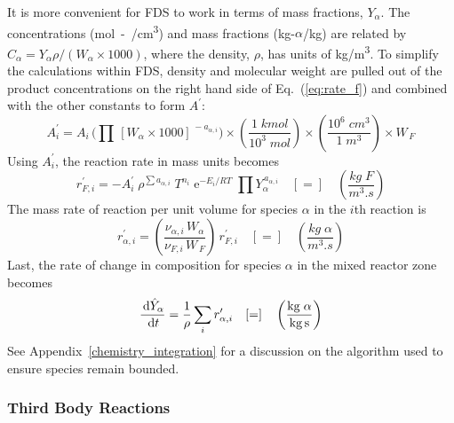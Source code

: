 It is more convenient for FDS to work in terms of mass fractions, $Y_{\alpha}$.  The concentrations (\unit{mol-\alpha/cm^3}) and mass fractions (kg-$\alpha$/kg) are related by $C_{\alpha}=Y_{\alpha} \rho/(W_{\alpha} \times 1000)$, where the density, $\rho$, has units of \unit{kg/m^3}.
To simplify the calculations within FDS, density and molecular weight are pulled out of the product concentrations on the right hand side of Eq.~(\ref{eq:rate_f}) and combined with the other constants to form $A^{\prime}$:
\begin{equation}\label{eq:aprime}
A^{\prime}_{i} = A_{i} \, \bigg( \prod \, [W_{\alpha} \times 1000]^{\,-a_{\alpha,i}} \bigg) \times \left(\frac{1 \; \unit{kmol}}{10^3 \; \unit{mol}}\right) \times \left(\frac{10^6 \; \unit{cm^3}}{1 \; \unit{m^3}}\right) \times W_{\,\unit{F}}
\end{equation}
Using $A_i^{\prime}$, the reaction rate in mass units becomes
\begin{equation}\label{eq:finite_rate_fin}
r^{\prime}_{\unit{F},i} = -A_i^{\prime}\;\rho^{\sum a_{\alpha,i}}\;T^{n_i}\;\mathrm{e}^{-E_i/RT}\;\prod Y_{\alpha}^{\,a_{\alpha,i}} \quad [=] \quad \left(\frac{\unit{kg \; F}}{\unit{m^3.s}}\right)
\end{equation}
The mass rate of reaction per unit volume for species $\alpha$ in the $i$th reaction is
\begin{equation}\label{eq:rate_a_y}
r^{\prime}_{\alpha,i}= \left(\frac{\nu_{\alpha,i}\,W_{\alpha}}{\nu_{\unit{F},i}\,W_{\,\unit{F}}}\right)\,r^{\prime}_{\unit{F},i} \quad [=] \quad \left(\frac{\unit{kg \; \alpha}}{\unit{m^3.s}}\right)
\end{equation}
Last, the rate of change in composition for species $\alpha$ in the mixed reactor zone becomes
\begin{equation}\label{rate_expression_y}
\frac{\d \hat{Y}_{\alpha}}{\d t} = \frac{1}{\rho}\sum_{i} r^{\prime}_{\alpha,i} \quad [=] \quad \left(\frac{\unit{kg \; \alpha}}{\unit{kg.s}}\right)
\end{equation}
See Appendix~\ref{chemistry_integration} for a discussion on the algorithm used to ensure species remain bounded.

\subsubsection{Third Body Reactions}

